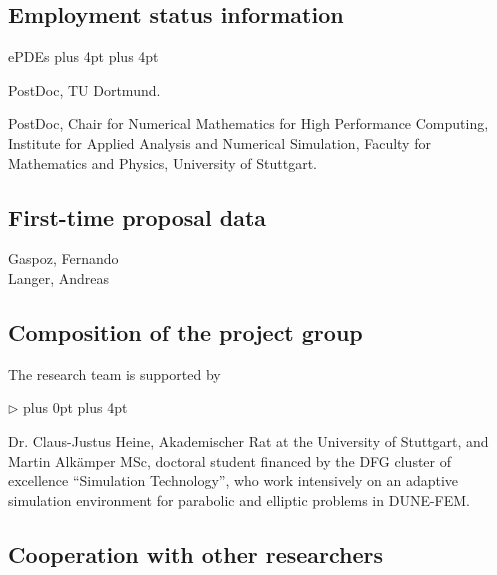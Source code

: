 \documentclass[enabledeprecatedfontcommands,cleardoublepage=empty,headsepline,twoside,11pt,DIV=15,BCOR=12mm,final]{scrartcl}
\renewenvironment{description}
{\begin{list}{\epdes}{\topsep0mm \labelwidth0mm \leftmargin3mm %
  \itemsep1pt plus 4pt \topsep3pt \parsep1pt plus 4pt \labelsep3mm}}
{\end{list}}
\renewenvironment{itemize}
{\begin{list}{$\triangleright$}{\labelwidth-2mm \leftmargin3mm %
  \itemsep5pt plus 0pt  \topsep3pt \parsep1pt plus 4pt \labelsep2mm}}
{\end{list}}
\newcommand{\dunefem}{\textsf{DUNE-FEM}\xspace}
\newcommand{\epdes}{\textsf{ePDEs}\xspace}
\begin{document}
\subsection{Employment status information}
\label{sec:empl-stat-inform}
\begin{description}
\item[Fernando D. Gaspoz:] PostDoc, TU Dortmund.
\item[Andreas Langer:] PostDoc, Chair for Numerical Mathematics for High Performance Computing, Institute for Applied Analysis and Numerical  Simulation, Faculty for Mathematics and Physics, University of Stuttgart.
\end{description}

\subsection{First-time proposal data}
Gaspoz, Fernando\\
Langer, Andreas

\subsection{Composition of the project group}
\label{sec:comp-proj-group}


The research team is supported by
\begin{itemize}
\item Dr. Claus-Justus Heine, Akademischer Rat at the University of Stuttgart,
  and Martin Alk\"amper MSc, doctoral student financed by the DFG cluster of excellence
  ``Simulation Technology'', who work intensively on an
  adaptive simulation environment for parabolic and elliptic problems in \dunefem.
\end{itemize}

\subsection{Cooperation with other researchers}
\label{sec:coop-with-other}
\end{document}
